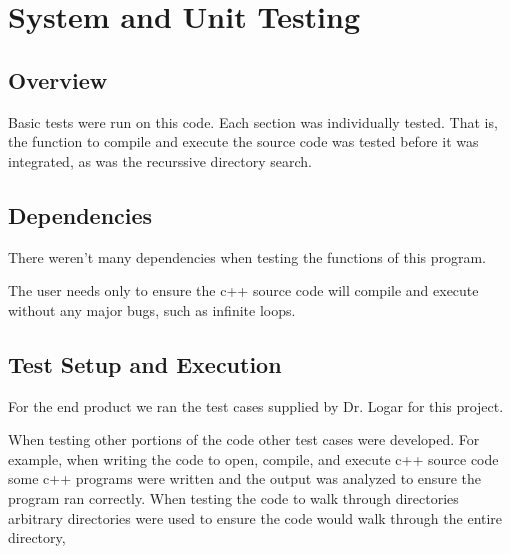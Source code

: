 
\chapter{System  and Unit Testing}

\section{Overview}
Basic tests were run on this code. Each section was individually tested. That is, the function to compile and execute the source code was tested before it was integrated, as was the recurssive directory search. 



\section{Dependencies}
There weren't many dependencies when testing the functions of this program. 

The user needs only to ensure the c++ source code will compile and execute without any major bugs, such as infinite loops. 


\section{Test Setup and Execution}
For the end product we ran the test cases supplied by Dr. Logar for this project.

When testing other portions of the code other test cases were developed. For example, when writing the code to open, compile, and execute c++ source code some c++ programs were written and the output was analyzed to ensure the program ran correctly. When testing the code to walk through directories arbitrary directories were used to ensure the code would walk through the entire directory, 
